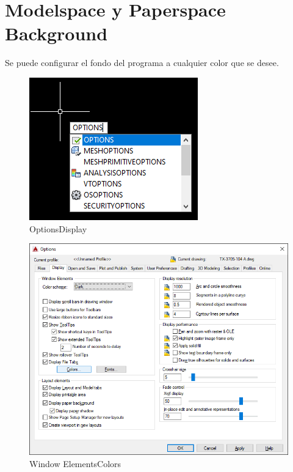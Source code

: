 \documentclass{report}
\begin{document}
\chapter{Modelspace y Paperspace Background}

Se puede configurar el fondo del programa a cualquier color que se desee.

\begin{figure}[H]
	\centering
	\includegraphics[width=0.75\linewidth, height=0.5\textheight,keepaspectratio]{Imagenes/autocad_background_01}
	\caption{Options\textrightarrow Display}
	\label{fig:autocadbackground01}
\end{figure}

\begin{figure}[H]
	\centering
	\includegraphics[width=0.75\linewidth, height=0.5\textheight,keepaspectratio]{Imagenes/autocad_background_02}
	\caption{Window Elements\textrightarrow Colors}
	\label{fig:autocadbackground02}
\end{figure}
\end{document}
